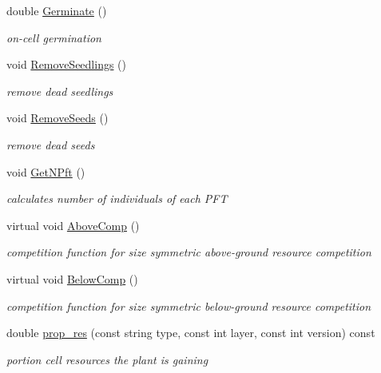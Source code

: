 \begin{DoxyCompactItemize}
double \mbox{\hyperlink{class_c_cell_ac1a582012f1d54a21b9b7252d4b06f8f}{Germinate}} ()
\begin{DoxyCompactList}\small\item\em on-\/cell germination \end{DoxyCompactList}\item 
void \mbox{\hyperlink{class_c_cell_ab23766c8c30b500992b53535088f204f}{Remove\+Seedlings}} ()
\begin{DoxyCompactList}\small\item\em remove dead seedlings \end{DoxyCompactList}\item 
void \mbox{\hyperlink{class_c_cell_a4e261cc154f9f96eeb96772e354a1b34}{Remove\+Seeds}} ()
\begin{DoxyCompactList}\small\item\em remove dead seeds \end{DoxyCompactList}\item 
void \mbox{\hyperlink{class_c_cell_a5a6f6346ee1e347e67ceddffd7295e6a}{Get\+N\+Pft}} ()
\begin{DoxyCompactList}\small\item\em calculates number of individuals of each P\+FT \end{DoxyCompactList}\item 
virtual void \mbox{\hyperlink{class_c_cell_a48c7bf623f025697d0875ee282b8c75b}{Above\+Comp}} ()
\begin{DoxyCompactList}\small\item\em competition function for size symmetric above-\/ground resource competition \end{DoxyCompactList}\item 
virtual void \mbox{\hyperlink{class_c_cell_aab26e9d4c0150cee0bbc7f836f0d6b34}{Below\+Comp}} ()
\begin{DoxyCompactList}\small\item\em competition function for size symmetric below-\/ground resource competition \end{DoxyCompactList}\item 
double \mbox{\hyperlink{class_c_cell_a6fb57406cb9aeeabe9feecbfc7625da4}{prop\+\_\+res}} (const string type, const int layer, const int version) const
\begin{DoxyCompactList}\small\item\em portion cell resources the plant is gaining \end{DoxyCompactList}\end{DoxyCompactItemize}
